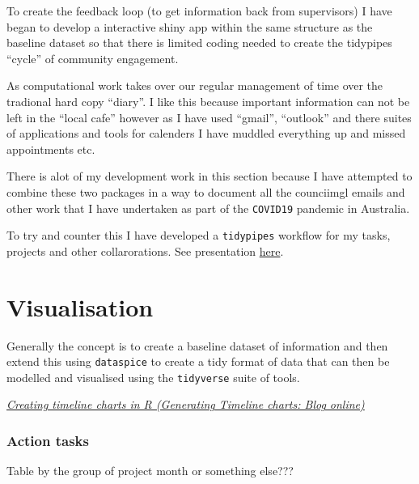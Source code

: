To create the feedback loop (to get information back from supervisors) I have began to develop a interactive shiny app within the same structure as the baseline dataset so that there is limited coding needed to create the tidypipes ``cycle'' of community engagement.
\begin{Shaded}
\begin{Highlighting}[]
\end{Highlighting}
\end{Shaded}
As computational work takes over our regular management of time over the tradional hard copy ``diary''. I like this because important information can not be left in the ``local cafe'' however as I have used ``gmail'', ``outlook'' and there suites of applications and tools for calenders I have muddled everything up and missed appointments etc.

There is alot of my development work in this section because I have attempted to combine these two packages in a way to document all the counciimgl emails and other work that I have undertaken as part of the \texttt{COVID19} pandemic in Australia.

To try and counter this I have developed a \texttt{tidypipes} workflow for my tasks, projects and other collarorations. See presentation \href{./assets/TidyPipes-calenderJUL2020.pptx}{here}.

\hypertarget{visualisation}{%
\chapter{Visualisation}\label{visualisation}}

Generally the concept is to create a baseline dataset of information and then extend this using \texttt{dataspice} to create a tidy format of data that can then be modelled and visualised using the \texttt{tidyverse} suite of tools.

\href{}{\emph{Creating timeline charts in R (Generating Timeline charts: Blog online)}}

\hypertarget{action-tasks}{%
\subsection{Action tasks}\label{action-tasks}}

Table by the group of project month or something else???

